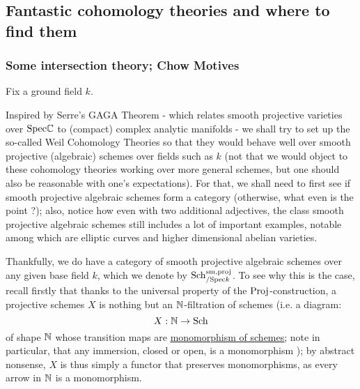         \subsection{Fantastic cohomology theories and where to find them}
            \subsubsection{Some intersection theory; Chow Motives}
                \begin{remark} \label{remark: categories_of_smooth_projective_schemes}
                    Fix a ground field $k$. 
                    
                    Inspired by Serre's GAGA Theorem - which relates smooth projective varieties over $\mathrm{Spec} \mathbb{C}$ to (compact) complex analytic manifolds - we shall try to set up the so-called Weil Cohomology Theories so that they would behave well over smooth projective (algebraic) schemes over fields such as $k$ (not that we would object to these cohomology theories working over more general schemes, but one should also be reasonable with one's expectations). For that, we shall need to first see if smooth projective algebraic schemes form a category (otherwise, what even is the point ?); also, notice how even with two additional adjectives, the class smooth projective algebraic schemes still includes a lot of important examples, notable among which are elliptic curves and higher dimensional abelian varieties.
                    
                    Thankfully, we do have a category of smooth projective algebraic schemes over any given base field $k$, which we denote by $\mathrm{Sch}_{/\mathrm{Spec} k}^{\mathrm{sm}, \mathrm{proj}}$. To see why this is the case, recall firstly that thanks to the universal property of the $\mathrm{Proj}$-construction, a projective schemes $X$ is nothing but an $\mathbb{N}$-filtration of schemes (i.e. a diagram:
                        $$X: \mathbb{N} \to \mathrm{Sch}$$
                    of shape $\mathbb{N}$ whose transition maps are \href{https://stacks.math.columbia.edu/tag/01L1}{\underline{monomorphism of schemes}}; note in particular, that any immersion, closed or open, is a monomorphism \cite[\href{https://stacks.math.columbia.edu/tag/01L7}{Tag 01L7}]{stacks}); by abstract nonsense, $X$ is thus simply a functor that preserves monomorphisms, as every arrow in $\mathbb{N}$ is a monomorphism.  
                \end{remark}
                
